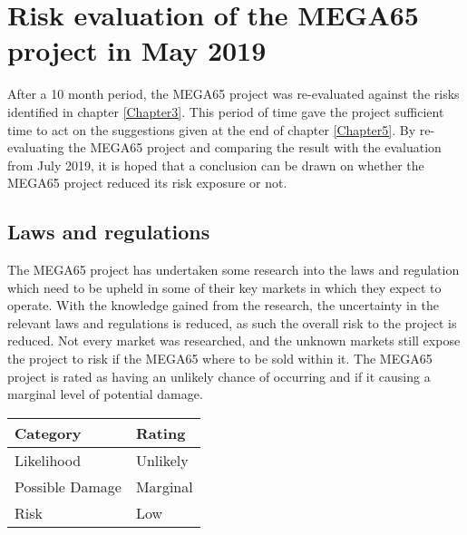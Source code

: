 
\chapter{Risk evaluation of the MEGA65 project in May 2019}
\label{Chapter6}
After a 10 month period, the MEGA65 project was re-evaluated against the risks identified in chapter \ref{Chapter3}. This period of time gave the project sufficient time to act on the suggestions given at the end of chapter \ref{Chapter5}. By re-evaluating the MEGA65 project and comparing the result with the evaluation from July 2019, it is hoped that a conclusion can be drawn on whether the MEGA65 project reduced its risk exposure or not. 

\section{Laws and regulations}
The MEGA65 project has undertaken some research into the laws and regulation which need to be upheld in some of their key markets in which they expect to operate. With the knowledge gained from the research, the uncertainty in the relevant laws and regulations is reduced, as such the overall risk to the project is reduced. Not every market was researched, and the unknown markets still expose the project to risk if the MEGA65 where to be sold within it. The MEGA65 project is rated as having an unlikely chance of occurring and if it causing a marginal level of potential damage. \\

\begin{tabular}{l|l} %
    	\textbf{Category} 	&	\textbf{Rating} \\
      \hline
     Likelihood			&	Unlikely \\
     Possible Damage 	& 	Marginal \\
     Risk 				&	Low		\\	
    \end{tabular}


